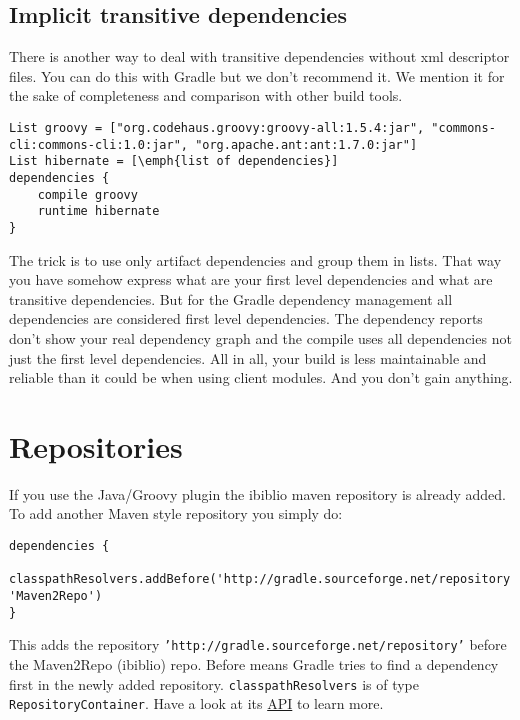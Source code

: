 \subsection{Implicit transitive dependencies} %
There is another way to deal with transitive dependencies without xml descriptor files. You can do this with Gradle but we don't recommend it. We mention it for the sake of completeness and comparison with other build tools. 

\begin{Verbatim}
List groovy = ["org.codehaus.groovy:groovy-all:1.5.4:jar", "commons-cli:commons-cli:1.0:jar", "org.apache.ant:ant:1.7.0:jar"]
List hibernate = [\emph{list of dependencies}]
dependencies {
	compile groovy
	runtime hibernate
}
\end{Verbatim}

The trick is to use only artifact dependencies and group them in lists. That way you have somehow express what are your first level dependencies and what are transitive dependencies. But for the Gradle dependency management all dependencies are considered first level dependencies. The dependency reports don't show your real dependency graph and the compile uses all dependencies not just the first level dependencies. All in all, your build is less maintainable and reliable than it could be when using client modules. And you don't gain anything.  

\label{sub:implicit_transitive_dependencies}



\section{Repositories} %
\label{sec:repositories}

If you use the Java/Groovy plugin the ibiblio maven repository is already added. To add another Maven style repository you simply do: 

\begin{Verbatim}
dependencies {
	classpathResolvers.addBefore('http://gradle.sourceforge.net/repository', 'Maven2Repo')
}
\end{Verbatim}

This adds the repository \texttt{'http://gradle.sourceforge.net/repository'} before the Maven2Repo (ibiblio) repo. Before means Gradle tries to find a dependency first in the newly added repository. \texttt{classpathResolvers} is of type \texttt{RepositoryContainer}. Have a look at its \href{\api_root/org}{API} to learn more.

